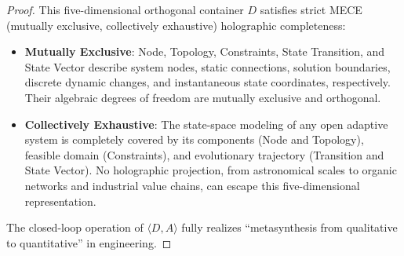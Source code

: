 \documentclass{article}
\begin{document}
\begin{proof}
This five-dimensional orthogonal container $D$ satisfies strict MECE (mutually exclusive, collectively exhaustive) holographic completeness:
\begin{itemize}
    \item \textbf{Mutually Exclusive}: Node, Topology, Constraints, State Transition, and State Vector describe system nodes, static connections, solution boundaries, discrete dynamic changes, and instantaneous state coordinates, respectively. Their algebraic degrees of freedom are mutually exclusive and orthogonal.
    \item \textbf{Collectively Exhaustive}: The state-space modeling of any open adaptive system is completely covered by its components (Node and Topology), feasible domain (Constraints), and evolutionary trajectory (Transition and State Vector). No holographic projection, from astronomical scales to organic networks and industrial value chains, can escape this five-dimensional representation.
\end{itemize}
The closed-loop operation of $\langle D, A \rangle$ fully realizes ``metasynthesis from qualitative to quantitative'' in engineering.
\end{proof}
\end{document}
